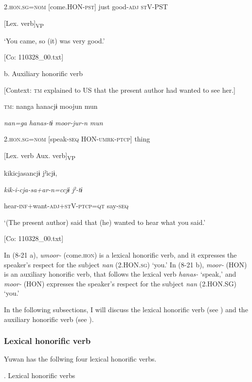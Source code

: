       2.\textsc{hon}.\textsc{sg}=\textsc{nom}  [come.HON-\textsc{pst}]  just  good-\textsc{adj}  \textsc{st}V-PST

        [Lex. verb]\textsubscript{VP}      

      ‘You came, so (it) was very good.’

      [Co: 110328\_00.txt]

  b.  Auxiliary honorific verb

    [Context: \textsc{tm} explained to US that the present author had wanted to see her.]

    \textsc{tm}:  nanga  hanacjɨ  moojun  mun

      \textit{nan=ga}  \textit{hanas-tɨ}  \textit{moor{}-jur-n  mun}

      2.\textsc{hon}.\textsc{sg}=\textsc{nom}  [speak-\textsc{seq}  HON-\textsc{umrk}-\textsc{ptcp}]  thing

        [Lex. verb  Aux. verb]\textsubscript{VP}  

      kikicjasancjɨ  jˀicjɨ,

      \textit{kik-i-cja-sa+ar-n=ccjɨ}  \textit{jˀ-tɨ}

      hear-\textsc{inf}+want-\textsc{adj}+\textsc{st}V-\textsc{ptcp}=\textsc{qt}  say-\textsc{seq}

      ‘(The present author) said that (he) wanted to hear what you said.’

      [Co: 110328\_00.txt]

In (8-21 a), \textit{umoor-} (come.\textsc{hon}) is a lexical honorific verb, and it expresses the speaker’s respect for the subject \textit{nan} (2.HON.\textsc{sg}) ‘you.’ In (8-21 b), \textit{moor-} (HON) is an auxiliary honorific verb, that follows the lexical verb \textit{hanas-} ‘speak,’ and \textit{moor-} (HON) expresses the speaker’s respect for the subject \textit{nan} (2.HON.SG) ‘you.’

  In the following subsections, I will discuss the lexical honorific verb (see ) and the auxiliary honorific verb (see ).

\subsubsection{Lexical honorific verb}

Yuwan has the follwing four lexical honorific verbs.

\begin{styleBeschriftung}
\textmd{}\textmd{. Lexical honorific verbs}
\end{styleBeschriftung}


